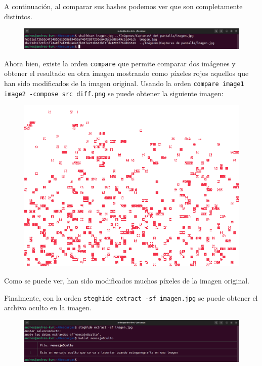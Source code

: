 \documentclass{article}
\begin{document}
A continuación, al comparar sus hashes podemos ver que son completamente distintos.

\begin{figure}[H]
    \includegraphics[width=\textwidth]{imagenes/Captura desde 2022-10-30 11-38-52.png}
\end{figure}

\bigskip

Ahora bien, existe la orden \verb|compare| que permite comparar dos imágenes y obtener el resultado en otra imagen mostrando como píxeles rojos aquellos que han sido modificados de la imagen original. Usando la orden \verb|compare image1 image2 -compose src diff.png| se puede obtener la siguiente imagen:

\begin{figure}[H]
    \includegraphics[width=\textwidth]{imagenes/diff.png}
\end{figure}

\bigskip

Como se puede ver, han sido modificados muchos píxeles de la imagen original.

\bigskip

Finalmente, con la orden \verb|steghide extract -sf imagen.jpg| se puede obtener el archivo oculto en la imagen.

\begin{figure}[H]
    \includegraphics[width=\textwidth]{imagenes/Captura desde 2022-10-30 11-44-23.png}
\end{figure}
\end{document}
